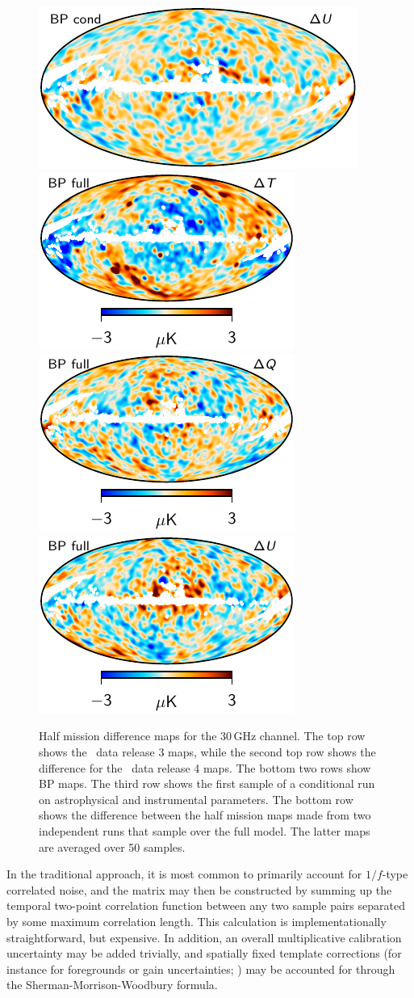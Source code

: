 \documentclass[twocolumn]{aa}
\begin{document}
\begin{figure}[t]
  \includegraphics[width=0.33\linewidth]{figs/johs/halfdiff_artem_U_30.pdf}\\
  \includegraphics[width=0.33\linewidth]{figs/johs/halfdiff_johannes_T_30.pdf}
  \includegraphics[width=0.33\linewidth]{figs/johs/halfdiff_johannes_Q_30.pdf}
  \includegraphics[width=0.33\linewidth]{figs/johs/halfdiff_johannes_U_30.pdf}\\
  \caption{Half mission difference maps for the 30\,GHz channel. The top row shows the \Planck\ data release 3 maps, while the second top row shows the difference for the \Planck\ data release 4 maps. The bottom two rows show BP maps.
  The third row shows the first sample of a conditional run on astrophysical and instrumental parameters. The bottom row shows the difference between the half mission maps made from two independent runs that sample over the full model. The latter maps are averaged over 50 samples.}
  \label{fig:halfdiff-30}
\end{figure}


In the traditional approach, it is most common to primarily account
for $1/f$-type correlated noise, and the matrix may then be
constructed by summing up the temporal two-point correlation function
between any two sample pairs separated by some maximum correlation
length. This calculation is implementationally straightforward, but
expensive. In addition, an overall multiplicative calibration
uncertainty may be added trivially, and spatially fixed template
corrections (for instance for foregrounds or gain uncertainties;
\citealp{planck2016-l02}) may be accounted for through the
Sherman-Morrison-Woodbury formula.
\end{document}
